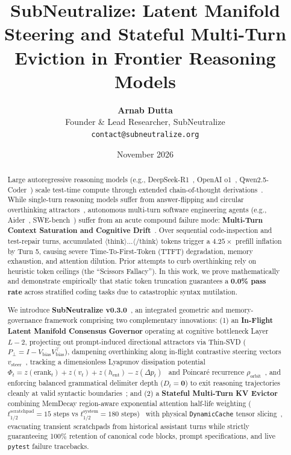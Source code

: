\documentclass[10pt,twocolumn,letterpaper]{article}
\title{\textbf{SubNeutralize: Latent Manifold Steering and Stateful Multi-Turn Eviction in Frontier Reasoning Models}}
\author{
  \textbf{Arnab Dutta}\\
  Founder \& Lead Researcher, SubNeutralize\\
  \texttt{contact@subneutralize.org}
}
\date{November 2026}
\begin{document}
\maketitle

\begin{abstract}
Large autoregressive reasoning models (e.g., DeepSeek-R1~\cite{deepseek2025r1}, OpenAI o1~\cite{openai2024o1}, Qwen2.5-Coder~\cite{qwen2024coder}) scale test-time compute through extended chain-of-thought derivations~\cite{snell2024scaling,muennighoff2025s1}. While single-turn reasoning models suffer from answer-flipping and circular overthinking attractors~\cite{pipis2025wait,kumar2025overthink,su2025between}, autonomous multi-turn software engineering agents (e.g., Aider~\cite{gauthier2024aider}, SWE-bench~\cite{jimenez2024swebench}) suffer from an acute compound failure mode: \textbf{Multi-Turn Context Saturation and Cognitive Drift}~\cite{sui2026tact,caldarella2026thinking}. Over sequential code-inspection and test-repair turns, accumulated $\langle\text{think}\rangle\dots\langle/\text{think}\rangle$ tokens trigger a $4.25\times$ prefill inflation by Turn 5, causing severe Time-To-First-Token (TTFT) degradation, memory exhaustion, and attention dilution. Prior attempts to curb overthinking rely on heuristic token ceilings (the ``Scissors Fallacy''). In this work, we prove mathematically and demonstrate empirically that static token truncation guarantees a \textbf{0.0\% pass rate} across stratified coding tasks due to catastrophic syntax mutilation. 

We introduce \textbf{SubNeutralize v0.3.0}~\cite{dutta2026subneutralize}, an integrated geometric and memory-governance framework comprising two complementary innovations:
(1) an \textbf{In-Flight Latent Manifold Consensus Governor} operating at cognitive bottleneck Layer $L-2$, projecting out prompt-induced directional attractors via Thin-SVD ($P_{\perp} = I - V_{\text{bias}} V_{\text{bias}}^\top$), dampening overthinking along in-flight contrastive steering vectors $v_{\text{steer}}$~\cite{huang2025manifold,rimsky2023steering,zou2023representation}, tracking a dimensionless Lyapunov dissipation potential $\Phi_t = z(\text{erank}_t) + z(v_t) + z(h_{\text{ent}}) - z(\Delta p_t)$~\cite{yang2025deer,codestop2026early} and Poincaré recurrence $\rho_{\text{orbit}}$~\cite{pipis2025wait}, and enforcing balanced grammatical delimiter depth ($D_t = \mathbf{0}$) to exit reasoning trajectories cleanly at valid syntactic boundaries~\cite{puma2026semantic}; and 
(2) a \textbf{Stateful Multi-Turn KV Evictor} combining MemDecay region-aware exponential attention half-life weighting ($t_{1/2}^{\text{scratchpad}} = 15$ steps vs $t_{1/2}^{\text{system}} = 180$ steps)~\cite{matam2026memdecay,li2026intentkv} with physical \texttt{DynamicCache} tensor slicing~\cite{li2024snapkv,xiao2024streamingllm,zhang2023h2o}, evacuating transient scratchpads from historical assistant turns while strictly guaranteeing 100\% retention of canonical code blocks, prompt specifications, and live \texttt{pytest} failure tracebacks. 


\end{abstract}
\end{document}
